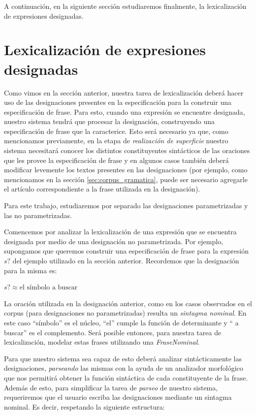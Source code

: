 A continuación, en la siguiente sección estudiaremos finalmente, la lexicalización de expresiones designadas.

\section{Lexicalización de expresiones designadas}
\label{sec:verbalizacion_designaciones}
Como vimos en la sección anterior, nuestra tarea de lexicalización deberá hacer uso de las designaciones presentes en la especificación para la construir una especificación de frase. Para esto, cuando una expresión se encuentre designada, nuestro sistema tendrá que procesar la designación, construyendo una especificación de frase que la caracterice. Esto será necesario ya que, como mencionamos previamente, en la etapa de \emph{realización de superficie} nuestro sistema necesitará conocer los distintos constituyentes sintácticos de las oraciones que les provee la especificación de frase y en algunos casos también deberá modificar levemente los textos presentes en las designaciones (por ejemplo, como mencionamos en la sección \ref{sec:corpus_gramatica}, puede ser necesario agregarle el artículo correspondiente a la frase utilizada en la designación).

Para este trabajo, estudiaremos por separado las designaciones parametrizadas y las no parametrizadas.

Comencemos por analizar la lexicalización de una expresión que se encuentra designada por medio de una designación no parametrizada. Por ejemplo, supongamos que queremos construir una especificación de frase para la expresión $s?$ del ejemplo utilizado en la sección anterior. Recordemos que la designación para la misma es:

\begin{center} 
  $s? \approx \text{el símbolo a buscar}$ 
\end{center}

La oración utilizada en la designación anterior, como en los casos observados en el corpus (para designaciones no parametrizadas) resulta un \emph{sintagma nominal}. En este caso ``símbolo'' es el núcleo, ``el'' cumple la función de determinante y `` a buscar'' es el complemento. Será posible entonces, para nuestra tarea de lexicalización, modelar estas frases utilizando una \emph{FraseNominal}. 

Para que nuestro sistema sea capaz de esto deberá analizar sintácticamente las designaciones, \textit{parseando} las mismas con la ayuda de un analizador morfológico que nos permitirá obtener la función sintáctica de cada constituyente de la frase. Además de esto, para simplificar la tarea de \emph{parseo} de nuestro sistema, requeriremos que el usuario escriba las designaciones mediante un sintagma nominal. Es decir, respetando la siguiente estructura:

